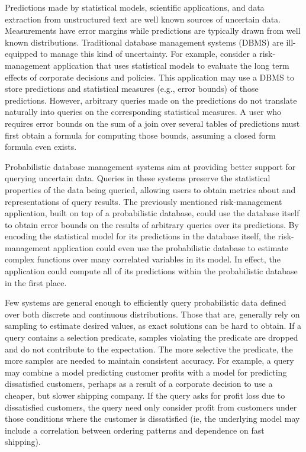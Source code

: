 Predictions made by statistical models, scientific applications, and data extraction from unstructured text are well known sources of uncertain data.  Measurements have error margins while predictions are typically drawn from well known distributions.  Traditional database management systems (DBMS) are ill-equipped to manage this kind of uncertainty.  For example, consider a risk-management application that uses statistical models to evaluate the long term effects of corporate decisions and policies.  This application may use a DBMS to store predictions and statistical measures (e.g., error bounds) of those predictions.  However, arbitrary queries made on the predictions do not translate naturally into queries on the corresponding statistical measures.  A user who requires error bounds on the sum of a join over several tables of predictions must first obtain a formula for computing those bounds, assuming a closed form formula even exists.

Probabilistic  database  management  systems \cite{dalvi07efficient, WidomTrio2008, KochMayBMS2008, SD2007, ORION, MCDB, BayesStore} aim at providing better support for querying uncertain data.  Queries in these systems preserve the statistical properties of the data being queried, allowing users to obtain metrics about and representations of query results.  The previously mentioned risk-management application, built on top of a probabilistic database, could use the database itself to obtain error bounds on the results of arbitrary queries over its predictions.  By encoding the statistical model for its predictions in the database itself, the risk-management application could even use the probabilistic database to estimate complex functions over many correlated variables in its model.  In effect, the application could compute all of its predictions within the probabilistic database in the first place.

Few systems are general enough to efficiently query probabilistic data defined over both discrete and continuous distributions.  Those that are, generally rely on sampling to estimate desired values, as exact solutions can be hard to obtain.  If a query contains a selection predicate, samples violating the predicate are dropped and do not contribute to the expectation.  The more selective the predicate, the more samples are needed to maintain consistent accuracy.  For example, a query may combine a model predicting customer profits with a model for predicting dissatisfied customers, perhaps as a result of a corporate decision to use a cheaper, but slower shipping company.  If the query asks for profit loss due to dissatisfied customers, the query need only consider profit from customers under those conditions where the customer is dissatisfied (ie, the underlying model may include a correlation between ordering patterns and dependence on fast shipping).  

